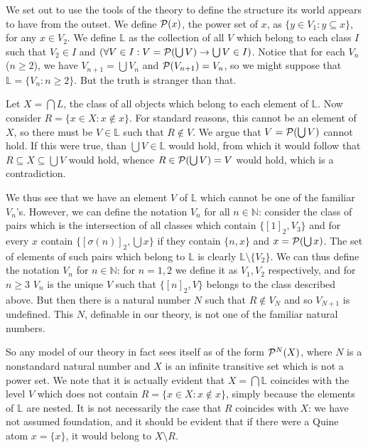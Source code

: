 \documentclass[12pt]{article}
\begin{document}
We set out to use the tools of the theory to define the structure its world appears to have from the outset.  We define ${\cal P}(x)$, the power set of $x$, as $\{y \in V_1:y \subseteq x\}$, for any $x \in V_2$.  We define $\mathbb L$ as the collection of all $V$ which belong to
each class $I$ such that $V_2 \in I$ and $(\forall V \in I:V = {\cal P}(\bigcup V) \rightarrow \bigcup V \in I)$.   Notice that for each $V_n$ ($n \geq 2$), we have $V_{n+1} = \bigcup V_n$ and
${\cal P}(V_{n+1}) = V_n$, so we might suppose that ${\mathbb L} = \{V_n:n \geq 2\}$.  But the truth is stranger than that.

Let $X = \bigcap L$, the class of all objects which belong to each element of $\mathbb L$.  Now consider $R = \{x \in X:x \not\in x\}$.  For standard reasons, this cannot be an element of $X$, so there must be $V \in \mathbb L$ such that $R \not\in V$.  We argue that $V = {\cal P}(\bigcup V)$ cannot hold.  If this were true, than $\bigcup V \in \mathbb L$ would hold, 
from which it would follow that $R \subseteq X \subseteq \bigcup V$ would hold, whence $R \in {\cal P}(\bigcup V) = V$ would hold, which is a contradiction.

We thus see that we have an element $V$ of $\mathbb L$ which cannot be one of the familiar $V_n$'s.  However, we can define the notation $V_n$ for all $n \in \mathbb N$:
consider the class of pairs which is the intersection of all classes which contain $\{[1]_2,V_3\}$ and for every $x$ contain $\{[\sigma(n)]_2,\bigcup x\}$ if they contain $\{n,x\}$ and $x = {\cal P}(\bigcup x)$.
The set of elements of such pairs which belong to $\mathbb L$ is clearly $\mathbb L \setminus \{V_2\}$.  We can thus define the notation $V_n$ for $n \in \mathbb N$:
for $n=1,2$ we define it as $V_1,V_2$ respectively, and for $n \geq 3$ $V_n$ is the unique $V$ such that $\{[n]_2,V\}$ belongs to the class described above.  But then there is
a natural number $N$ such that $R \not\in V_N$ and so $V_{N+1}$ is undefined.  This $N$, definable in our theory, is not one of the familiar natural numbers.

So any model of our theory in fact sees itself as of the form ${\cal P}^N(X)$, where $N$ is a nonstandard natural number and $X$ is an infinite transitive set which is not a power set.
We note that it is actually evident that $X= \bigcap \mathbb L$ coincides with the level $V$ which does not contain $R =\{x \in X:x \not\in x\}$, simply because the elements of
$\mathbb L$ are nested.  It is not necessarily the case that $R$ coincides with $X$:  we have not assumed foundation, and it should be evident that if there were a Quine atom
$x = \{x\}$, it would belong to $X \setminus R$.
\end{document}
